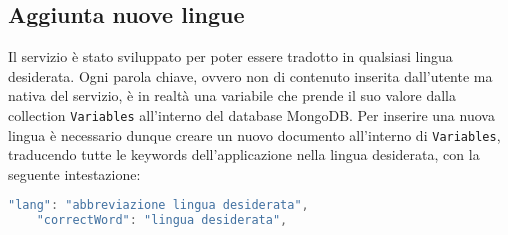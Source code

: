 \subsection{Aggiunta nuove lingue}
Il servizio \progetto{} è stato sviluppato per poter essere tradotto in qualsiasi lingua desiderata. Ogni parola chiave, ovvero non di contenuto inserita dall'utente ma nativa del servizio, è in realtà una variabile che prende il suo valore dalla collection \texttt{Variables} all'interno del database MongoDB. Per inserire una nuova lingua è necessario dunque creare un nuovo documento all'interno di \texttt{Variables}, traducendo tutte le keywords dell'applicazione nella lingua desiderata, con la seguente intestazione:
\begin{lstlisting}[language=Java,firstnumber=1]
	"lang": "abbreviazione lingua desiderata",
	"correctWord": "lingua desiderata",
\end{lstlisting}
